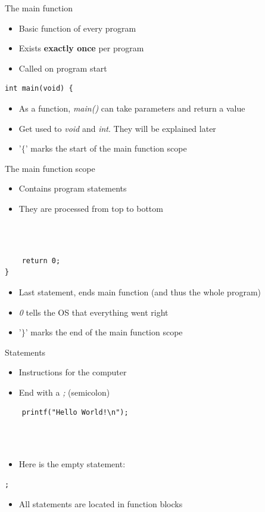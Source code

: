 \begin{frame}[fragile]{The main function}
	\begin{itemize}
		\item Basic function of every program
		\item Exists \textbf{exactly once} per program
		\item Called on program start
	\end{itemize}
	\begin{lstlisting}
int main(void) {
\end{lstlisting}
	\begin{itemize}
		\item As a function, \textit{main()} can take parameters and return a value
		\item Get used to \textit{void} and \textit{int}. They will be explained later
		\item '$\lbrace$' marks the start of the main function scope
	\end{itemize}
\end{frame}
\begin{frame}[fragile]{The main function scope}
	\begin{itemize}
		\item Contains program statements
		\item They are processed from top to bottom
	\end{itemize} \ \\
	\ \\
	\begin{lstlisting}
	return 0;
}
\end{lstlisting}
	\begin{itemize}
		\item Last statement, ends main function (and thus the whole program)
		\item \textit{0} tells the OS that everything went right
		\item '$\rbrace$' marks the end of the main function scope
	\end{itemize}
\end{frame}
\begin{frame}[fragile]{Statements}
	\begin{itemize}
		\item Instructions for the computer
		\item End with a \textit{;} (semicolon)
	\end{itemize}
	\begin{lstlisting}
	printf("Hello World!\n");
\end{lstlisting} \ \\ \ \\
	\begin{itemize}
		\item Here is the empty statement:
	\end{itemize}
	\begin{lstlisting}[numbers=none]
	;
\end{lstlisting}
	\begin{itemize}
		\item All statements are located in function blocks
	\end{itemize}
\end{frame}
